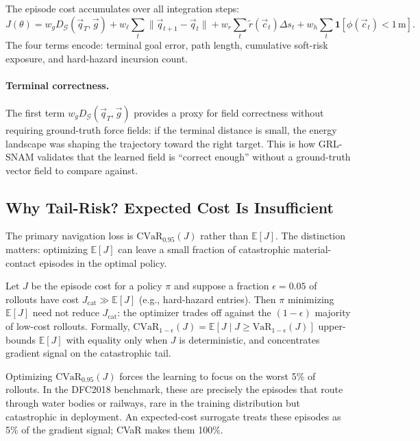 The episode cost accumulates over all integration steps:
\begin{equation}
  J(\theta)
  = w_g D_\mathcal{G}(\vec{q}_T,\vec{g})
  + w_\ell\sum_t\|\vec{q}_{t+1}-\vec{q}_t\|
  + w_r\sum_t\tilde{r}(\vec{c}_t)\Delta s_t
  + w_h\sum_t\mathbf{1}[\phi(\vec{c}_t)<1\,\text{m}].
  \label{eq:ch4:J}
\end{equation}
The four terms encode: terminal goal error, path length,
cumulative soft-risk exposure, and hard-hazard incursion count.

\paragraph{Terminal correctness.}
The first term $w_g D_\mathcal{G}(\vec{q}_T,\vec{g})$ provides
a proxy for field correctness without requiring ground-truth force
fields: if the terminal distance is small, the energy landscape was
shaping the trajectory toward the right target.
This is how GRL-SNAM validates that the learned field is
``correct enough'' without a ground-truth vector field to compare against.

\subsection{Why Tail-Risk? Expected Cost Is Insufficient}
\label{subsec:ch4:cvar_motivation}

The primary navigation loss is $\mathrm{CVaR}_{0.95}(J)$
rather than $\mathbb{E}[J]$.
The distinction matters: optimizing $\mathbb{E}[J]$ can leave a small
fraction of catastrophic material-contact episodes in the optimal policy.

\begin{proposition}
\label{prop:ch4:cvar}
Let $J$ be the episode cost for a policy $\pi$ and suppose a fraction
$\epsilon=0.05$ of rollouts have cost $J_{\mathrm{cat}}\gg\mathbb{E}[J]$
(e.g., hard-hazard entries).
Then $\pi$ minimizing $\mathbb{E}[J]$ need not reduce
$J_{\mathrm{cat}}$: the optimizer trades off against the
$(1-\epsilon)$ majority of low-cost rollouts.
Formally,
$\mathrm{CVaR}_{1-\epsilon}(J) = \mathbb{E}[J\mid J\geq\mathrm{VaR}_{1-\epsilon}(J)]$
upper-bounds $\mathbb{E}[J]$ with equality only when $J$ is
deterministic, and concentrates gradient signal on the
catastrophic tail.
\end{proposition}

Optimizing $\mathrm{CVaR}_{0.95}(J)$ forces the learning to focus
on the worst 5\% of rollouts.
In the DFC2018 benchmark, these are precisely the episodes that
route through water bodies or railways, rare in the training
distribution but catastrophic in deployment.
An expected-cost surrogate treats these episodes as 5\% of the
gradient signal; CVaR makes them 100\%.

